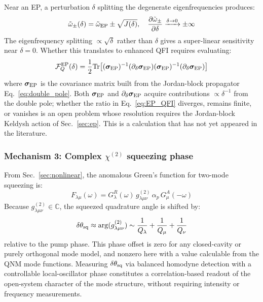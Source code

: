 \documentclass[12pt]{article}
\newcommand{\EP}{{\rm EP}}
\newcommand{\tomega}{\tilde{\omega}}
\begin{document}
Near an EP, a perturbation $\delta$ splitting the degenerate eigenfrequencies
produces:
\begin{equation}
  \tomega_\pm(\delta) = \tomega_\EP\pm\sqrt{J(\delta)},\quad
  \frac{\partial\tomega_\pm}{\partial\delta}
  \xrightarrow{\delta\to 0}\pm\infty
  \label{eq:EP_sensitivity}
\end{equation}
The eigenfrequency splitting $\propto\sqrt{\delta}$ rather than $\delta$
gives a super-linear sensitivity near $\delta=0$.  Whether this translates
to enhanced QFI requires evaluating:
\begin{equation}
  \mathcal{F}_Q^{\rm EP}(\delta) = \frac{1}{2}\mathrm{Tr}\!\left[
  (\boldsymbol{\sigma}_\EP)^{-1}(\partial_\delta\boldsymbol{\sigma}_\EP)
  (\boldsymbol{\sigma}_\EP)^{-1}(\partial_\delta\boldsymbol{\sigma}_\EP)
  \right]
  \label{eq:EP_QFI}
\end{equation}
where $\boldsymbol{\sigma}_\EP$ is the covariance matrix built from
the Jordan-block propagator Eq.~\eqref{eq:double_pole}.  Both
$\boldsymbol{\sigma}_\EP$ and $\partial_\delta\boldsymbol{\sigma}_\EP$
acquire contributions $\propto\delta^{-1}$ from the double pole; whether
the ratio in Eq.~\eqref{eq:EP_QFI} diverges, remains finite, or vanishes
is an open problem whose resolution requires the Jordan-block Keldysh
action of Sec.~\ref{sec:ep}. This is a calculation that has not yet
appeared in the literature.

\subsubsection*{Mechanism 3: Complex $\chi^{(2)}$ squeezing phase}

From Sec.~\ref{sec:nonlinear}, the anomalous Green's function for
two-mode squeezing is:
\begin{equation}
  F_{\lambda\mu}(\omega) =
  G^R_\lambda(\omega)\,g^{(2)}_{\lambda\mu\nu}\,\alpha_p\,G^A_\mu(-\omega)
  \label{eq:anomalous_GF}
\end{equation}
Because $g^{(2)}_{\lambda\mu\nu}\in\mathbb{C}$, the squeezed quadrature
angle is shifted by:
\begin{equation}
  \delta\theta_{\rm sq} \approx \arg(g^{(2)}_{\lambda\mu\nu})
  \sim \frac{1}{Q_\lambda}+\frac{1}{Q_\mu}+\frac{1}{Q_\nu}
  \label{eq:squeezing_phase}
\end{equation}
relative to the pump phase.  This phase offset is zero for any closed-cavity
or purely orthogonal mode model, and nonzero here with a value calculable
from the QNM mode functions.  Measuring $\delta\theta_{\rm sq}$ via
balanced homodyne detection with a controllable local-oscillator phase
constitutes a correlation-based readout of the open-system character of
the mode structure, without requiring intensity or frequency measurements.
\end{document}
